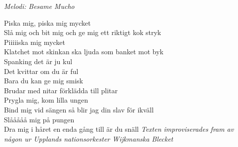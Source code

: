 {\footnotesize\textit{Melodi: Besame Mucho}}\par
\vspace{10pt}
\par
Piska mig, piska mig mycket\\
Slå mig och bit mig och ge mig ett riktigt kok stryk\\
Piiiiiska mig mycket\\
Klatchet mot skinkan ska ljuda som banket mot byk\\
Spanking det är ju kul\\
Det kvittar om du är ful\\
Bara du kan ge mig smisk\\
Brudar med nitar förklädda till plitar\\
Prygla mig, kom lilla ungen\\
Bind mig vid sängen så blir jag din slav för ikväll\\
Slååååå mig på pungen\\
Dra mig i håret en enda gång till är du snäll
\vspace{10pt}
{\footnotesize\textit{Texten improviserades fram av någon ur Upplands nationsorkester Wijkmanska Blecket}}
